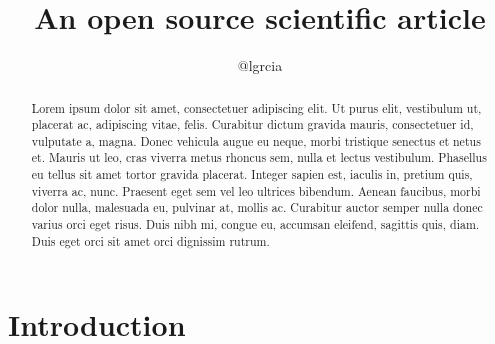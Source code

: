 \documentclass{aastex631}
\begin{document}
\title{An open source scientific article}

\author{@lgrcia}

\begin{abstract}
    Lorem ipsum dolor sit amet, consectetuer adipiscing elit.
    Ut purus elit, vestibulum ut, placerat ac, adipiscing vitae, felis.
    Curabitur dictum gravida mauris, consectetuer id, vulputate a, magna.
    Donec vehicula augue eu neque, morbi tristique senectus et netus et.
    Mauris ut leo, cras viverra metus rhoncus sem, nulla et lectus vestibulum.
    Phasellus eu tellus sit amet tortor gravida placerat.
    Integer sapien est, iaculis in, pretium quis, viverra ac, nunc.
    Praesent eget sem vel leo ultrices bibendum.
    Aenean faucibus, morbi dolor nulla, malesuada eu, pulvinar at, mollis ac.
    Curabitur auctor semper nulla donec varius orci eget risus.
    Duis nibh mi, congue eu, accumsan eleifend, sagittis quis, diam.
    Duis eget orci sit amet orci dignissim rutrum.
\end{abstract}

\section*{Introduction}
\label{sec:intro}
\end{document}
